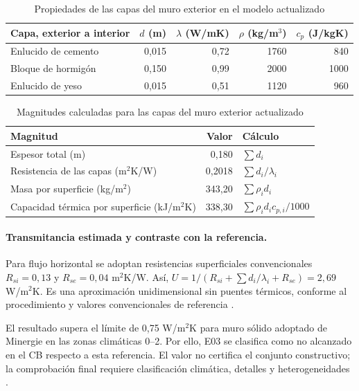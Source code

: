 \begin{table}[H]
\centering
\caption{Propiedades de las capas del muro exterior en el modelo actualizado}
{\small\begin{tabular}{p{4cm}rrrr}
\toprule
Capa, exterior a interior & $d$ (m) & $\lambda$ (W/mK) & $\rho$ (kg/m$^3$) & $c_p$ (J/kgK) \\
\midrule
Enlucido de cemento & 0,015 & 0,72 & 1760 & 840 \\
Bloque de hormigón & 0,150 & 0,99 & 2000 & 1000 \\
Enlucido de yeso & 0,015 & 0,51 & 1120 & 960 \\
\bottomrule
\end{tabular}}
\end{table}
\begin{table}[H]
\centering
\caption{Magnitudes calculadas para las capas del muro exterior actualizado}
{\small\begin{tabular}{p{6cm}rp{4cm}}
\toprule
Magnitud & Valor & Cálculo \\
\midrule
Espesor total (m) & 0,180 & $\sum d_i$ \\
Resistencia de las capas (m$^2$K/W) & 0,2018 & $\sum d_i/\lambda_i$ \\
Masa por superficie (kg/m$^2$) & 343,20 & $\sum \rho_i d_i$ \\
Capacidad térmica por superficie (kJ/m$^2$K) & 338,30 & $\sum \rho_i d_i c_{p,i}/1000$ \\
\bottomrule
\end{tabular}}
\end{table}

\paragraph{Transmitancia estimada y contraste con la referencia.}
Para flujo horizontal se adoptan resistencias superficiales convencionales $R_{si}=0,13$ y $R_{se}=0,04$ m$^2$K/W. Así, $U=1/(R_{si}+\sum d_i/\lambda_i+R_{se})=2,69$ W/m$^2$K. Es una aproximación unidimensional sin puentes térmicos, conforme al procedimiento y valores convencionales de referencia \parencite{xellaResistenciasSuperficiales}.

El resultado supera el límite de 0,75 W/m$^2$K para muro sólido adoptado de Minergie en las zonas climáticas 0--2. Por ello, E03 se clasifica como no alcanzado en el CB respecto a esta referencia. El valor no certifica el conjunto constructivo; la comprobación final requiere clasificación climática, detalles y heterogeneidades \parencite{minergieLatamReglamento2025}.
